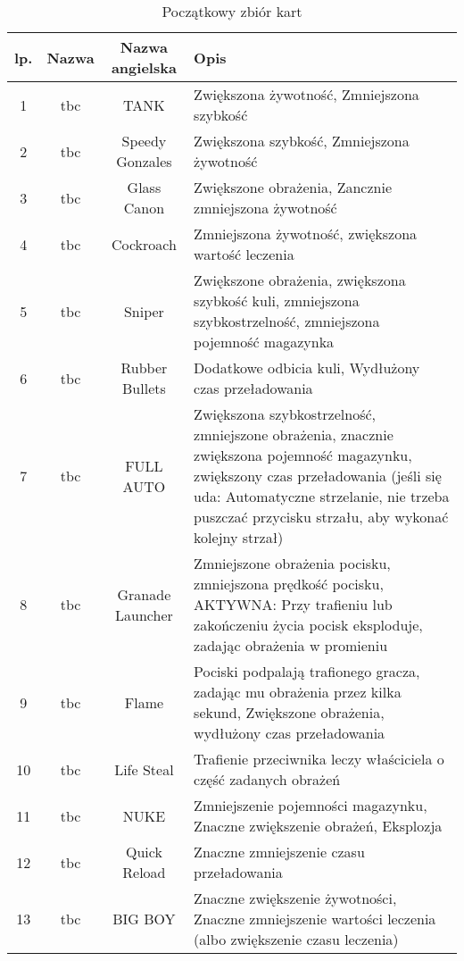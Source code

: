 \begin{table}
    \small
    \centering
    \caption{Początkowy zbiór kart}
    \label{tab:cards}
    \begin{tabularx}{\linewidth}{|c|c|c|X|}
        \hline
        lp. & Nazwa & Nazwa angielska & Opis\\
        \hline \hline
        1 & tbc & TANK & Zwiększona żywotność, Zmniejszona szybkość \\
        \hline 
        2 & tbc & Speedy Gonzales & Zwiększona szybkość, Zmniejszona żywotność \\
        \hline 
        3 & tbc & Glass Canon & Zwiększone obrażenia, Zancznie zmniejszona żywotność \\
        \hline 
        4 & tbc & Cockroach & Zmniejszona żywotność, zwiększona wartość leczenia \\
        \hline 
        5 & tbc & Sniper & Zwiększone obrażenia, zwiększona szybkość kuli, zmniejszona szybkostrzelność, zmniejszona pojemność magazynka \\
        \hline 
        6 & tbc & Rubber Bullets & Dodatkowe odbicia kuli, Wydłużony czas przeładowania\\
        \hline 
        7 & tbc & FULL AUTO & Zwiększona szybkostrzelność, zmniejszone obrażenia, znacznie zwiększona pojemność magazynku, zwiększony czas przeładowania (jeśli się uda: Automatyczne strzelanie, nie trzeba puszczać przycisku strzału, aby wykonać kolejny strzał) \\
        \hline 
        8 & tbc & Granade Launcher & Zmniejszone obrażenia pocisku, zmniejszona prędkość pocisku, AKTYWNA: Przy trafieniu lub zakończeniu życia pocisk eksploduje, zadając obrażenia w promieniu \\
        \hline 
        9 & tbc & Flame & Pociski podpalają trafionego gracza, zadając mu obrażenia przez kilka sekund, Zwiększone obrażenia, wydłużony czas przeładowania \\
        \hline 
        10 & tbc & Life Steal & Trafienie przeciwnika leczy właściciela o część zadanych obrażeń  \\
        \hline 
        11 & tbc & NUKE & Zmniejszenie pojemności magazynku, Znaczne zwiększenie obrażeń, Eksplozja\\
        \hline 
        12 & tbc & Quick Reload & Znaczne zmniejszenie czasu przeładowania \\
        \hline 
        13 & tbc & BIG BOY & Znaczne zwiększenie żywotności, Znaczne zmniejszenie wartości leczenia (albo zwiększenie czasu leczenia)  \\

\end{tabularx}
\end{table}
